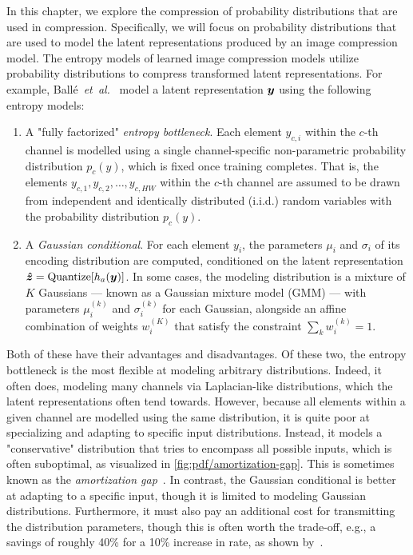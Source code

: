 In this chapter, we explore the compression of probability distributions that are used in compression.
Specifically, we will focus on probability distributions that are used to model the latent representations produced by an image compression model.
The entropy models of learned image compression models utilize probability distributions to compress transformed latent representations.
For example, Ballé~\emph{et~al.}~\cite{balle2018variational} model a latent representation ${\boldsymbol{y}}$ using the following entropy models:
\begin{enumerate}
  \item
    A "fully factorized" \emph{entropy bottleneck}.
    Each element ${y}_{c,i}$ within the $c$-th channel is modelled using a single channel-specific non-parametric probability distribution ${p}_{c}(y)$, which is fixed once training completes.
    That is, the elements ${y}_{c,1}, {y}_{c,2}, \ldots, {y}_{c,H W}$ within the $c$-th channel are assumed to be drawn from independent and identically distributed (i.i.d.) random variables with the probability distribution ${p}_c(y)$.
  \item
    A \emph{Gaussian conditional}.
    For each element ${y}_{i}$, the parameters ${\mu}_{i}$ and ${\sigma}_{i}$ of its encoding distribution are computed, conditioned on the latent representation ${\boldsymbol{\hat{z}}} = \operatorname{Quantize}[h_a({\boldsymbol{y}})]$.
    In some cases, the modeling distribution is a mixture of $K$ Gaussians --- known as a Gaussian mixture model (GMM) --- with parameters ${\mu}_{i}^{(k)}$ and ${\sigma}_{i}^{(k)}$ for each Gaussian, alongside an affine combination of weights ${w}_{i}^{(K)}$ that satisfy the constraint $\sum_k {w}_{i}^{(k)} = 1$.
\end{enumerate}
Both of these have their advantages and disadvantages.
Of these two, the entropy bottleneck is the most flexible at modeling arbitrary distributions.
Indeed, it often does, modeling many channels via Laplacian-like distributions, which the latent representations often tend towards.
However, because all elements within a given channel are modelled using the same distribution, it is quite poor at specializing and adapting to specific input distributions.
Instead, it models a "conservative" distribution that tries to encompass all possible inputs, which is often suboptimal, as visualized in \cref{fig:pdf/amortization-gap}.
This is sometimes known as the \emph{amortization gap}~\cite{balcilar2022amortizationgap,cremer2018inferencesuboptimality}.
In contrast, the Gaussian conditional is better at adapting to a specific input, though it is limited to modeling Gaussian distributions.
Furthermore, it must also pay an additional cost for transmitting the distribution parameters, though this is often worth the trade-off, e.g., a savings of roughly 40\% for a 10\% increase in rate, as shown by~\cite{balle2018variational}.


